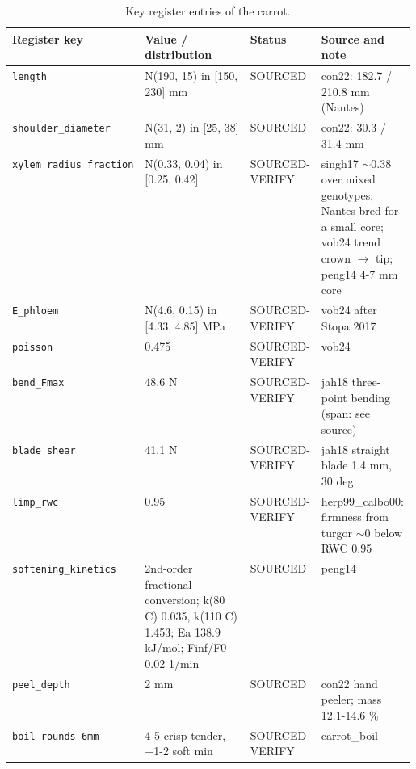 \documentclass[10.5pt,a4paper]{article}
\begin{document}
\begin{table}[htbp]\centering\scriptsize\caption{Key register entries of the carrot.}
\begin{tabularx}{\linewidth}{@{}p{0.19\linewidth}p{0.27\linewidth}p{0.12\linewidth}X@{}}\toprule Register key & Value / distribution & Status & Source and note \\\midrule
\texttt{length} & N(190, 15) in [150, 230] mm & SOURCED & con22: 182.7 / 210.8 mm (Nantes) \\
\texttt{shoulder\_\allowbreak{}diameter} & N(31, 2) in [25, 38] mm & SOURCED & con22: 30.3 / 31.4 mm \\
\texttt{xylem\_\allowbreak{}radius\_\allowbreak{}fraction} & N(0.33, 0.04) in [0.25, 0.42] & SOURCED-VERIFY & singh17 $\sim$0.38 over mixed genotypes; Nantes bred for a small core; vob24 trend crown $\to$ tip; peng14 4-7 mm core \\
\texttt{E\_\allowbreak{}phloem} & N(4.6, 0.15) in [4.33, 4.85] MPa & SOURCED-VERIFY & vob24 after Stopa 2017 \\
\texttt{poisson} & 0.475 & SOURCED-VERIFY & vob24 \\
\texttt{bend\_\allowbreak{}Fmax} & 48.6 N & SOURCED-VERIFY & jah18 three-point bending (span: see source) \\
\texttt{blade\_\allowbreak{}shear} & 41.1 N & SOURCED-VERIFY & jah18 straight blade 1.4 mm, 30 deg \\
\texttt{limp\_\allowbreak{}rwc} & 0.95 & SOURCED-VERIFY & herp99\_calbo00: firmness from turgor $\sim$0 below RWC 0.95 \\
\texttt{softening\_\allowbreak{}kinetics} & 2nd-order fractional conversion; k(80 C) 0.035, k(110 C) 1.453; Ea 138.9 kJ/mol; Finf/F0 0.02 1/min & SOURCED & peng14 \\
\texttt{peel\_\allowbreak{}depth} & 2 mm & SOURCED & con22 hand peeler; mass 12.1-14.6 \% \\
\texttt{boil\_\allowbreak{}rounds\_\allowbreak{}6mm} & 4-5 crisp-tender, +1-2 soft min & SOURCED-VERIFY & carrot\_boil \\\bottomrule\end{tabularx}\end{table}
\end{document}
